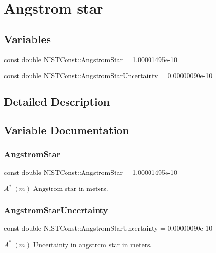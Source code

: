 \hypertarget{group___angstrom_star}{}\section{Angstrom star}
\label{group___angstrom_star}
\subsection*{Variables}
\begin{DoxyCompactItemize}
\item 
const double \hyperlink{group___angstrom_star_ga42db9558ed1ddd9706c14e4d0b0863cc}{N\+I\+S\+T\+Const\+::\+Angstrom\+Star} = 1.\+00001495e-\/10
\item 
const double \hyperlink{group___angstrom_star_ga13575debadc16e90aefbe76fdfa771a6}{N\+I\+S\+T\+Const\+::\+Angstrom\+Star\+Uncertainty} = 0.\+00000090e-\/10
\end{DoxyCompactItemize}


\subsection{Detailed Description}


\subsection{Variable Documentation}
\mbox{\label{group___angstrom_star_ga42db9558ed1ddd9706c14e4d0b0863cc}} 
\subsubsection{\texorpdfstring{Angstrom\+Star}{AngstromStar}}
{\footnotesize\ttfamily const double N\+I\+S\+T\+Const\+::\+Angstrom\+Star = 1.\+00001495e-\/10}

$A^{\ast} \ (m)$ Angstrom star in meters. \mbox{\label{group___angstrom_star_ga13575debadc16e90aefbe76fdfa771a6}} 
\subsubsection{\texorpdfstring{Angstrom\+Star\+Uncertainty}{AngstromStarUncertainty}}
{\footnotesize\ttfamily const double N\+I\+S\+T\+Const\+::\+Angstrom\+Star\+Uncertainty = 0.\+00000090e-\/10}

$A^{\ast} \ (m)$ Uncertainty in angstrom star in meters. 